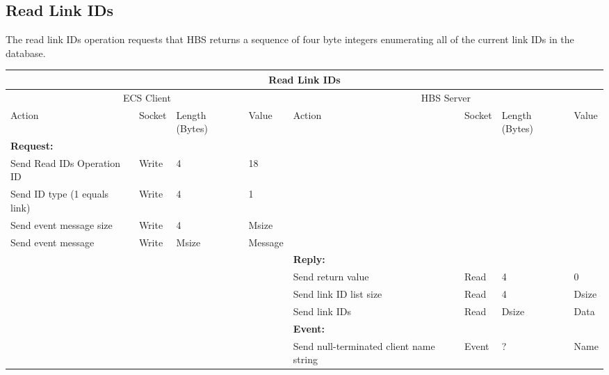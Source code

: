 \newpage
\subsection{Read Link IDs}

The  read link IDs operation requests that HBS returns a sequence of four
byte integers enumerating all of the current link IDs in the database.


\bigskip
\small
\begin{tabular}{|p{1.2in}|p{.4in}|p{.4in}|p{.5in}|p{1.2in}|p{.4in}|p{.4in}|p{.5in} |} \hline
\multicolumn{8}{|c|}{{\bf Read Link IDs}} \\ \hline
\multicolumn{4}{|c|}{ECS Client} & \multicolumn{4}{|c|}{HBS Server} \\ \hline
Action            & Socket & Length  
                            (Bytes)& Value & Action       & Socket & Length 
                                                                    (Bytes)& Value \\ \hline
\multicolumn{4}{|l}{{\bf Request:}}&\multicolumn{4}{|l|}{~} \\ \hline
Send Read IDs Operation ID  & Write  & 4     & 18     &              &        &       &       \\ \hline
Send ID type (1 equals link)      & Write  & 4     &  1 &           &        &       &       \\ \hline
Send event
message size      & Write  & 4     &  Msize &         &        &       &       \\ \hline
Send event message
                  & Write  &  Msize  &  Message &     &        &       &       \\ \hline
\multicolumn{4}{|l}{~}&\multicolumn{4}{|l|}{{\bf Reply:}} \\ \hline
                  &        &       &       & Send return
                                             value        & Read   &  4    & 0       \\ \hline
                  &        &       &       & Send link ID list size & Read &  4    &  Dsize \\ \hline
                  &        &       &       & Send link IDs    & Read   & Dsize &  Data \\ \hline
\multicolumn{4}{|l}{~}&\multicolumn{4}{|l|}{{\bf Event:}} \\ \hline
                  &        &       &       & Send null-terminated client
                                             name string  & Event  &  ?    & Name  \\ \hline

\end{tabular}
